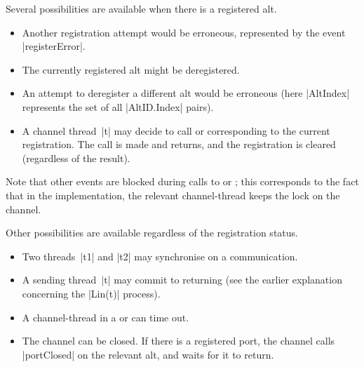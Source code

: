 Several possibilities are available when there is a registered alt.
%
\begin{itemize}
\item Another registration attempt would be erroneous, represented by the
  event |registerError|.

\item The currently registered alt might be deregistered.

\item An attempt to deregister a different alt would be erroneous (here
  |AltIndex| represents the set of all |AltID.Index| pairs).

\item A channel thread~|t| may decide to call  or
   corresponding to the current registration.  The call is
  made and returns, and the registration is cleared (regardless of the
  result). 
\end{itemize}
%
Note that other events are blocked during calls to  or
; this corresponds to the fact that in the implementation,
the relevant channel-thread keeps the lock on the channel.

Other possibilities are available regardless of the registration status.
%
\begin{itemize}
\item Two threads~|t1| and |t2| may synchronise on a communication.

\item A sending thread~|t| may commit to returning (see the earlier
  explanation concerning the |Lin(t)| process). 

\item A channel-thread in a  or  can
  time out. 

\item The channel can be closed.  If there is a registered port, the channel
  calls |portClosed| on the relevant alt, and waits for it to return.
\end{itemize}



